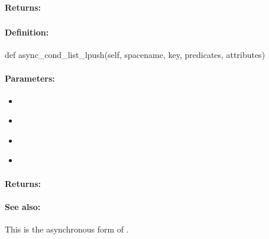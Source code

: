\paragraph{Returns:}


\pagebreak
\subsubsection{}
\label{api:python:async_cond_list_lpush}


\paragraph{Definition:}
\begin{pythoncode}
def async_cond_list_lpush(self, spacename, key, predicates, attributes)
\end{pythoncode}

\paragraph{Parameters:}
\begin{itemize}[noitemsep]
\item {}\\

\item {}\\

\item {}\\

\item {}\\

\end{itemize}

\paragraph{Returns:}


\paragraph{See also:}  This is the asynchronous form of .

